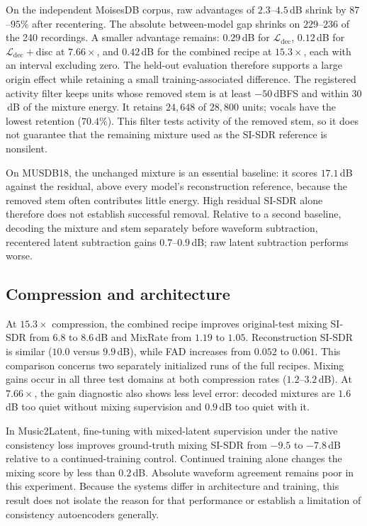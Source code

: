 \documentclass[conference]{IEEEtran}
\newcommand{\Ldec}{\mathcal{L}_\mathrm{dec}}
\begin{document}
On the independent MoisesDB corpus, raw advantages of $2.3$--$4.5$\,dB
shrink by $87$--$95$\% after recentering. The absolute between-model gap
shrinks on $229$--$236$ of the 240 recordings. A smaller advantage remains:
$0.29$\,dB for $\Ldec$, $0.12$\,dB for $\Ldec{+}$disc at $7.66\times$,
and $0.42$\,dB for the combined recipe at $15.3\times$, each with an
interval excluding zero. The held-out evaluation therefore supports a large
origin effect while retaining a small training-associated difference.
The registered activity filter keeps units whose removed stem is at least
$-50$\,dBFS and within $30$\,dB of the mixture energy. It retains
$24{,}648$ of $28{,}800$ units; vocals have the lowest retention ($70.4\%$).
This filter tests activity of the removed stem, so it does not guarantee
that the remaining mixture used as the SI-SDR reference is nonsilent.

On MUSDB18, the unchanged mixture is an essential baseline: it scores $17.1$\,dB
against the residual, above every model's reconstruction reference, because
the removed stem often contributes little energy. High residual SI-SDR alone
therefore does not establish successful removal. Relative to a second
baseline, decoding the mixture and stem separately before waveform
subtraction, recentered latent subtraction gains $0.7$--$0.9$\,dB; raw
latent subtraction performs worse.

\subsection{Compression and architecture}\label{sec:scope}
At $15.3\times$ compression, the combined recipe improves original-test
mixing SI-SDR from $6.8$ to $8.6$\,dB and MixRate from $1.19$ to $1.05$.
Reconstruction SI-SDR is similar ($10.0$ versus $9.9$\,dB), while FAD
increases from $0.052$ to $0.061$. This comparison concerns two separately
initialized runs of the full recipes. Mixing gains occur in all three test
domains at both compression rates ($1.2$--$3.2$\,dB). At $7.66\times$, the
gain diagnostic also shows less level error: decoded mixtures are $1.6$\,dB too quiet
without mixing supervision and $0.9$\,dB too quiet with it.

In Music2Latent, fine-tuning with mixed-latent supervision under the native
consistency loss improves ground-truth mixing SI-SDR from $-9.5$ to
$-7.8$\,dB relative to a continued-training control. Continued training
alone changes the mixing score by less than $0.2$\,dB. Absolute waveform
agreement remains poor in this experiment. Because the systems differ in
architecture and training, this result does not isolate the reason for that
performance or establish a limitation of consistency autoencoders generally.
\end{document}
